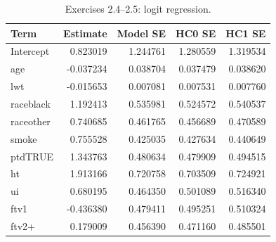 \begin{table}[htbp]
\centering
\small
\caption{Exercises 2.4--2.5: logit regression.}
\begin{tabular}{lrrrr}
\toprule
Term & Estimate & Model SE & HC0 SE & HC1 SE \\
\midrule
Intercept & 0.823019 & 1.244761 & 1.280559 & 1.319534 \\
age & -0.037234 & 0.038704 & 0.037479 & 0.038620 \\
lwt & -0.015653 & 0.007081 & 0.007531 & 0.007760 \\
raceblack & 1.192413 & 0.535981 & 0.524572 & 0.540537 \\
raceother & 0.740685 & 0.461765 & 0.456689 & 0.470589 \\
smoke & 0.755528 & 0.425035 & 0.427634 & 0.440649 \\
ptdTRUE & 1.343763 & 0.480634 & 0.479909 & 0.494515 \\
ht & 1.913166 & 0.720758 & 0.703509 & 0.724921 \\
ui & 0.680195 & 0.464350 & 0.501089 & 0.516340 \\
ftv1 & -0.436380 & 0.479411 & 0.495251 & 0.510324 \\
ftv2+ & 0.179009 & 0.456390 & 0.471160 & 0.485501 \\
\bottomrule
\end{tabular}
\end{table}
